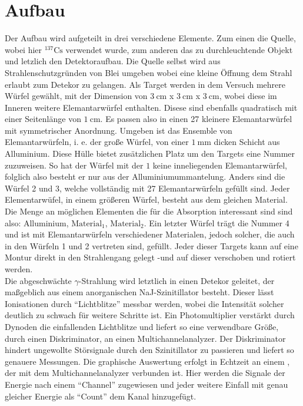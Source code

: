 \section{Aufbau}
Der Aufbau wird aufgeteilt in drei verschiedene Elemente. Zum einen die Quelle, wobei hier $^{137}\text{Cs}$ verwendet wurde, 
zum anderen das zu durchleuchtende Objekt und letzlich den Detektoraufbau. 
Die Quelle selbst wird aus Strahlenschutzgründen von Blei umgeben wobei eine kleine Öffnung dem Strahl erlaubt zum Detekor zu gelangen.
Als Target werden in dem Versuch mehrere Würfel gewählt, mit der Dimension von $\SI{3}{\centi\meter}$ x $\SI{3}{\centi\meter}$ x $\SI{3}{\centi\meter}$,
wobei diese im Inneren weitere Elemantarwürfel enthalten. Disese sind ebenfalls quadratisch mit einer Seitenlänge von $\SI{1}{\centi\meter}$.
Es passen also in einen 27 kleinere Elemantarwürfel mit symmetrischer Anordnung. Umgeben ist das Ensemble von Elemantarwürfeln, i. e.
der große Würfel, von einer $\SI{1}{\milli\meter}$ dicken Schicht aus Alluminium. Diese Hülle bietet zusätzlichen Platz um 
den Targets eine Nummer zuzuweisen. So hat der Würfel mit der $1$ keine inneliegenden Elemantarwürfel, folglich also besteht er nur aus
der Alluminiumummantelung. Anders sind die Würfel 2 und 3, welche vollständig mit 27 Elemantarwürfeln gefüllt sind.
Jeder Elementarwüfel, in einem größeren Würfel, besteht aus dem gleichen Material. Die Menge an möglichen Elementen die für die Absorption 
interessant sind sind also: Alluminium, $\text{Material}_{1}$, $\text{Material}_{2}$.
Ein letzter Würfel trägt die Nummer 4 und ist mit Elemantarwürfeln verschiedener Materialen, jedoch solcher, die auch in den Würfeln 1 und 2 vertreten sind, gefüllt.
Jeder dieser Targets kann auf eine Montur direkt in den Strahlengang gelegt -und auf dieser verschoben und rotiert werden.
\\
\newline
Die abgeschwächte $\gamma$-Strahlung wird letztlich in einen Detekor geleitet, der maßgeblich aus einem anorganischen NaJ-Szinitillator besteht.
Dieser lässt Ionisationen durch \enquote{Lichtblitze} messbar werden, wobei die Intensität solcher deutlich zu schwach für weitere Schritte ist.
Ein Photomultiplier verstärkt durch Dynoden die einfallenden Lichtblitze und liefert so eine verwendbare Größe, durch einen Diskriminator, 
an einen Multichannelanalyzer. Der Diskriminator hindert ungewollte Störsignale durch den Szinitillator zu passieren und liefert so genauere Messungen.
Die graphische Auswertung erfolgt in Echtzeit an einem , der mit dem Multichannelanalyzer verbunden ist. Hier werden die Signale 
der Energie nach einem \enquote{Channel} zugewiesen und jeder weitere Einfall mit genau gleicher Energie als \enquote{Count} dem Kanal hinzugefügt.

